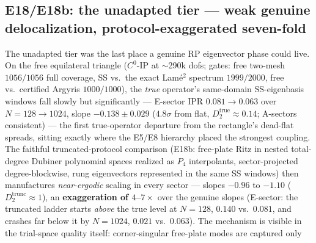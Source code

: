 \documentclass[11pt]{article}
\begin{document}
\subsection{E18/E18b: the unadapted tier --- weak genuine delocalization,
protocol-exaggerated seven-fold}
\label{sec:e18}

The unadapted tier was the last place a genuine RP eigenvector phase
could live. On the free equilateral triangle ($C^0$-IP at $\sim$290k
dofs; gates: free two-mesh $1056/1056$ full coverage, SS vs.\ the exact
Lam\'e$^2$ spectrum $1999/2000$, free vs.\ certified Argyris
$1000/1000$), the \emph{true} operator's same-domain SS-eigenbasis
windows fall slowly but significantly --- E-sector IPR $0.081\to0.063$
over $N=128\to1024$, slope $-0.138\pm0.029$ ($4.8\sigma$ from flat,
$D_2^{\mathrm{true}}\approx0.14$; A-sectors consistent) --- the first
true-operator departure from the rectangle's dead-flat spreads, sitting
exactly where the E5/E8 hierarchy placed the strongest coupling. The
faithful truncated-protocol comparison (E18b: free-plate Ritz in nested
total-degree Dubiner polynomial spaces realized as $P_4$ interpolants,
sector-projected degree-blockwise, rung eigenvectors represented in the
same SS windows) then manufactures \emph{near-ergodic} scaling in every
sector --- slopes $-0.96$ to $-1.10$ ($D_2^{\mathrm{trunc}}\approx1$),
an \textbf{exaggeration of $4$--$7\times$} over the genuine slopes
(E-sector: the truncated ladder starts \emph{above} the true level at
$N=128$, $0.140$ vs.\ $0.081$, and crashes far below it by $N=1024$,
$0.021$ vs.\ $0.063$). The mechanism is visible in the trial-space
quality itself: corner-singular free-plate modes are captured only
\end{document}
